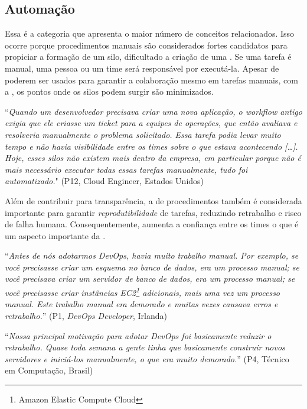 \subsection{Automação} \label{ssec:automation}

Essa é a categoria que apresenta o maior número de conceitos relacionados. Isso
ocorre porque procedimentos manuais são considerados fortes candidatos para
propiciar a formação de um silo, dificultado a criação de uma \cc. Se uma tarefa
é manual, uma pessoa ou um time será responsável por executá-la. Apesar de
 poderem ser usados para garantir a
colaboração mesmo em tarefas manuais, com a , os pontos onde os
silos podem surgir são minimizados.

\begin{mq}
``\emph{Quando um desenvolvedor precisava criar uma nova aplicação, o workflow
antigo exigia que ele criasse um ticket para a equipes de operações, que então
avaliava e resolveria manualmente o problema solicitado. Essa tarefa podia levar
muito tempo e não havia visibilidade entre os times sobre o que estava
acontecendo [\ldots]. Hoje, esses silos não existem mais dentro da empresa,
em particular porque não é mais necessário executar todas essas tarefas
manualmente, tudo foi automatizado.}" (P12, Cloud Engineer, Estados Unidos)
\end{mq}

Além de contribuir para transparência, a  de procedimentos
também é considerada importante para garantir \emph{reprodutibilidade} de
tarefas, reduzindo retrabalho e risco de falha humana. Consequentemente,
 aumenta a confiança entre os times o que é um aspecto importante
da \cc.

\begin{mq}
``\emph{Antes de nós adotarmos DevOps, havia muito trabalho manual. Por exemplo,
se você precisasse criar um esquema no banco de dados, era um processo manual;
se você precisava criar um servidor de banco de dados, era um processo manual;
se você precisasse criar instâncias EC2\footnote{Amazon Elastic Compute Cloud}
adicionais, mais uma vez um processo manual. Este trabalho manual era demorado
e muitas vezes causava erros e retrabalho.}'' (P1, {\it DevOps Developer}, Irlanda)
\end{mq}

\begin{mq}
``\emph{Nossa principal motivação para adotar DevOps foi basicamente reduzir o
retrabalho. Quase toda semana a gente tinha que basicamente construir novos
servidores e iniciá-los manualmente, o que era muito demorado.}'' (P4, Técnico
em Computação, Brasil)
\end{mq}

